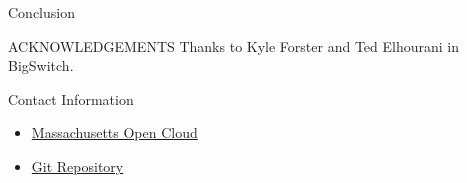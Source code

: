 \documentclass[final]{beamer}
\newlength{\onecolwid}
\begin{document}
\begin{frame}[t]
\begin{columns}[t]
\begin{column}{\onecolwid}
\begin{block}{Conclusion}
\end{block}





\begin{block}{ACKNOWLEDGEMENTS}
Thanks to Kyle Forster and Ted Elhourani in BigSwitch. 
\end{block}






\begin{alertblock}{Contact Information}

\begin{itemize}
\item \href{http://www.bu.edu/hic/research/massachusetts-open-cloud/}{Massachusetts Open Cloud}
\item \href{https://github.com/rahulbahal7/cloud-gateway}{Git Repository}
\end{itemize}

\end{alertblock}



\end{column} %

\end{columns} %

\end{frame} %
\end{document}
